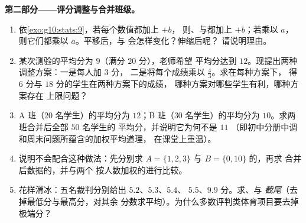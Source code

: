 \begin{problem}
\medskip
\noindent\textbf{第二部分——评分调整与合并班级。}
\begin{enumerate}[resume]
  \item 依\cref{exo:g10:stats:9}，若每个数值都加上 $+b$，
        则、与都加上 $+b$；若乘以 $a$，
        则它们都乘以 $a$。平移后，与
        会怎样变化？伸缩后呢？
        请说明理由。
  \item 某次测验的平均分为 $9$（满分 $20$ 分），老师希望
        平均分达到 $12$。现提出两种调整方案：一是每人加 $3$ 分，
        二是将每个成绩乘以 $\frac43$。求在每种方案下，
        得 $6$ 分与 $18$ 分的学生在两种方案下的成绩，
        哪种方案对哪些学生有利，哪种方案存在
        上限问题？
  \item A 班（$20$ 名学生）的平均分为 $12$；B 班（$30$
        名学生）的平均分为 $10$。求两班合并后全部 $50$ 名学生的
        平均分，并说明它为何不是 $11$
        （即初中分册中调和周末问题所蕴含的加权平均道理，
        在课堂上重温）。
  \item 说明不会配合这种做法：先分别求
        $A = \{1, 2, 3\}$ 与 $B = \{0, 10\}$ 的，再求
        合并后数据的，并与两个
        按人数加权的进行比较。
  \item 花样滑冰：五名裁判分别给出 $5.2$、$5.3$、$5.4$、
        $5.5$、$9.9$ 分。求、与
        \emph{截尾}（去掉最低分与最高分，对其余
        分数求平均）。为什么多数评判类体育项目要去掉极端分？
\end{enumerate}


\end{problem}
